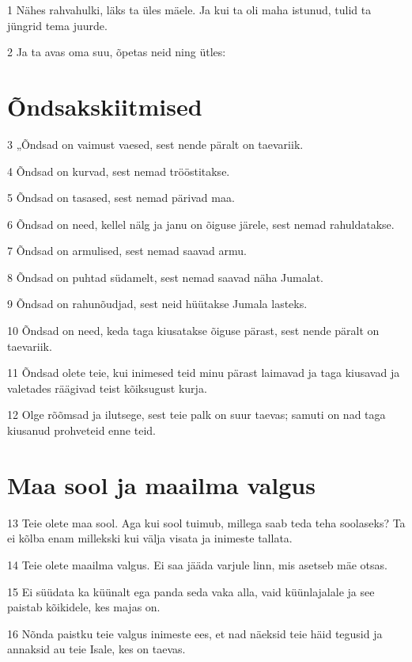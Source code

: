 \par 1 Nähes rahvahulki, läks ta üles mäele. Ja kui ta oli maha istunud, tulid ta jüngrid tema juurde.
\par 2 Ja ta avas oma suu, õpetas neid ning ütles:

\section*{Õndsakskiitmised}

\par 3 „Õndsad on vaimust vaesed, sest nende päralt on taevariik.
\par 4 Õndsad on kurvad, sest nemad trööstitakse.
\par 5 Õndsad on tasased, sest nemad pärivad maa.
\par 6 Õndsad on need, kellel nälg ja janu on õiguse järele, sest nemad rahuldatakse.
\par 7 Õndsad on armulised, sest nemad saavad armu.
\par 8 Õndsad on puhtad südamelt, sest nemad saavad näha Jumalat.
\par 9 Õndsad on rahunõudjad, sest neid hüütakse Jumala lasteks.
\par 10 Õndsad on need, keda taga kiusatakse õiguse pärast, sest nende päralt on taevariik.
\par 11 Õndsad olete teie, kui inimesed teid minu pärast laimavad ja taga kiusavad ja valetades räägivad teist kõiksugust kurja.
\par 12 Olge rõõmsad ja ilutsege, sest teie palk on suur taevas; samuti on nad taga kiusanud prohveteid enne teid.

\section*{Maa sool ja maailma valgus}

\par 13 Teie olete maa sool. Aga kui sool tuimub, millega saab teda teha soolaseks? Ta ei kõlba enam millekski kui välja visata ja inimeste tallata.
\par 14 Teie olete maailma valgus. Ei saa jääda varjule linn, mis asetseb mäe otsas.
\par 15 Ei süüdata ka küünalt ega panda seda vaka alla, vaid küünlajalale ja see paistab kõikidele, kes majas on.
\par 16 Nõnda paistku teie valgus inimeste ees, et nad näeksid teie häid tegusid ja annaksid au teie Isale, kes on taevas.


